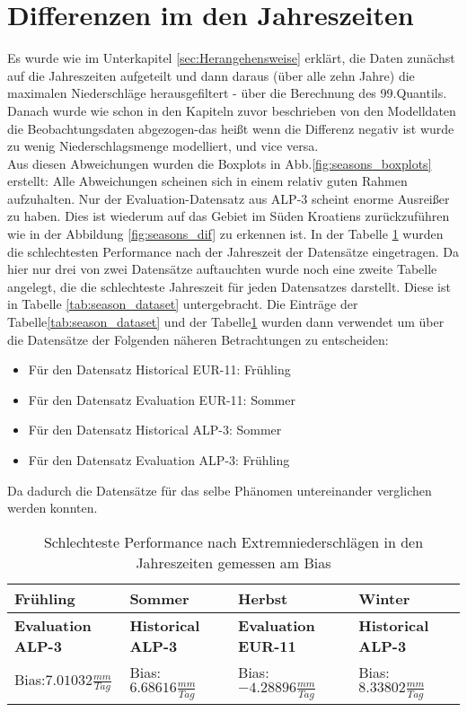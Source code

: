 \section{Differenzen im den Jahreszeiten}
Es wurde wie im Unterkapitel \ref{sec:Herangehensweise} erklärt, die Daten zunächst auf die Jahreszeiten aufgeteilt und dann daraus (über alle zehn Jahre) die maximalen Niederschläge herausgefiltert - über die Berechnung des 99.Quantils. Danach wurde wie schon in den Kapiteln zuvor beschrieben von den Modelldaten die Beobachtungsdaten abgezogen-das heißt wenn die Differenz negativ ist wurde zu wenig Niederschlagsmenge modelliert, und vice versa.\\
Aus diesen Abweichungen wurden die Boxplots in Abb.\ref{fig:seasons_boxplots} erstellt: Alle Abweichungen scheinen sich in einem relativ guten Rahmen aufzuhalten. Nur der Evaluation-Datensatz aus ALP-3 scheint enorme Ausreißer zu haben. Dies ist wiederum auf das Gebiet im Süden Kroatiens zurückzuführen wie in der Abbildung \ref{fig:seasons_dif} zu erkennen ist. In der Tabelle \ref{tab:season_bias} wurden die schlechtesten Performance nach der Jahreszeit der Datensätze eingetragen. Da hier nur drei von zwei Datensätze auftauchten wurde noch eine zweite Tabelle angelegt, die die schlechteste Jahreszeit für jeden Datensatzes darstellt. Diese ist in Tabelle \ref{tab:season_dataset} untergebracht. Die Einträge der Tabelle\ref{tab:season_dataset} und der Tabelle\ref{tab:season_bias} wurden dann verwendet um über die Datensätze der Folgenden näheren Betrachtungen zu entscheiden:
\begin{itemize}
	\item Für den Datensatz Historical EUR-11: Frühling
	\item Für den Datensatz Evaluation EUR-11: Sommer
	\item Für den Datensatz Historical ALP-3: Sommer
	\item Für den Datensatz Evaluation ALP-3: Frühling
\end{itemize}
Da dadurch die Datensätze für das selbe Phänomen untereinander verglichen werden konnten. 
\begin{table}[h]
	\begin{tabularx}{\textwidth}{|X|X|X|X|}
		\hline
		\textbf{Frühling} & \textbf{Sommer}& \textbf{Herbst} & \textbf{Winter}\\
		\hline
		\textbf{Evaluation ALP-3}  & \textbf{Historical ALP-3}  & \textbf{Evaluation EUR-11} & \textbf{Historical ALP-3} \\
		Bias:$7.01032\frac{mm}{Tag}$& Bias:$6.68616\frac{mm}{Tag}$ & Bias: $-4.28896\frac{mm}{Tag}$ & Bias:$8.33802\frac{mm}{Tag}$\\
		\hline
	\end{tabularx}
	\caption{Schlechteste Performance nach Extremniederschlägen in den Jahreszeiten gemessen am Bias}
	\label{tab:season_bias}
\end{table}
